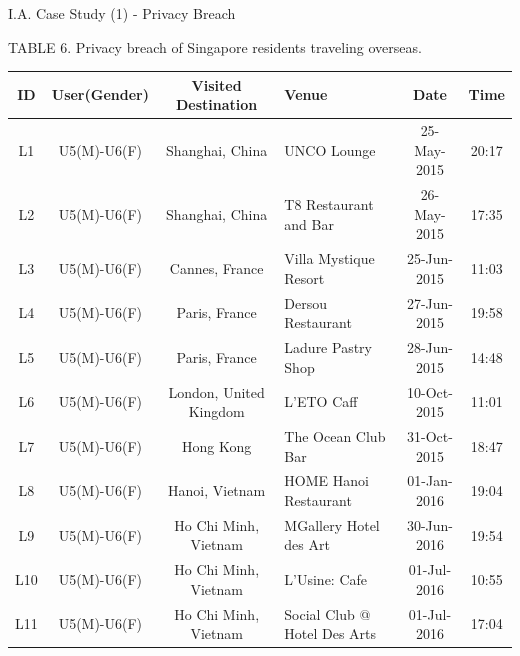 \documentclass[
 size=14pt,
 paper=smartboard,  %
 mode=present, 		%
 display=slides, 	%
 style=tuliplab,  	%
 pauseslide,
 fleqn,leqno]{powerdot}
\begin{document}


\begin{slide}[toc=,bm=]{I.A. Case Study (1) - Privacy Breach}

\begin{table}
	\fontsize{11pt}{11pt}\selectfont
	\setlength{\abovecaptionskip}{0pt}
	\setlength{\belowcaptionskip}{12pt}
	\centering
	\item
	TABLE 6. Privacy breach of Singapore residents traveling overseas\protect\footnotemark[1].\\[15pt]
	\begin{tabular}{c|c|c|l|c|c}	
	\toprule
	ID  				&  	\textbf{User(Gender)}		& 		\textbf{Visited Destination} 		& 		\textbf{Venue} 		& 	\textbf{Date} 		&	\textbf{Time}	\\
	\midrule
	L{\footnotesize1}	&	U{\footnotesize5}(M)-U{\footnotesize6}(F)	&	Shanghai, China 	&	UNCO Lounge				&	25-May-2015	&	20:17\\
	L{\footnotesize2}	&	U{\footnotesize5}(M)-U{\footnotesize6}(F)	&	Shanghai, China 	&	T8 Restaurant and Bar		&	26-May-2015	&	17:35\\
	L{\footnotesize3}	&	U{\footnotesize5}(M)-U{\footnotesize6}(F)	&	Cannes, France 	&	Villa Mystique Resort		&	25-Jun-2015	&	11:03\\
	L{\footnotesize4}	&	U{\footnotesize5}(M)-U{\footnotesize6}(F)	&	Paris, France 		&	Dersou Restaurant			&	27-Jun-2015	&	19:58\\
	L{\footnotesize5}	&	U{\footnotesize5}(M)-U{\footnotesize6}(F)	&	Paris, France 		&	Ladure Pastry Shop			&	28-Jun-2015	&	14:48\\
	L{\footnotesize6}	&	U{\footnotesize5}(M)-U{\footnotesize6}(F)	&	London, United Kingdom 		&	L'ETO Caff			&	10-Oct-2015	&	11:01\\
	L{\footnotesize7}	&	U{\footnotesize5}(M)-U{\footnotesize6}(F)	&	Hong Kong		&	The Ocean Club Bar			&	31-Oct-2015	&	18:47\\
	L{\footnotesize8}	&	U{\footnotesize5}(M)-U{\footnotesize6}(F)	&	Hanoi, Vietnam		&	HOME Hanoi Restaurant			&	01-Jan-2016	&	19:04\\
	L{\footnotesize9}	&	U{\footnotesize5}(M)-U{\footnotesize6}(F)	&	Ho Chi Minh, Vietnam		&	MGallery Hotel des Art		&	30-Jun-2016	&	19:54\\
	L{\footnotesize10}	&	U{\footnotesize5}(M)-U{\footnotesize6}(F)	&	Ho Chi Minh, Vietnam		&	L'Usine: Cafe		&	01-Jul-2016	&	10:55\\
	L{\footnotesize11}	&	U{\footnotesize5}(M)-U{\footnotesize6}(F)	&	Ho Chi Minh, Vietnam		&	Social Club @ Hotel Des Arts		&	01-Jul-2016	&	17:04\\
	\bottomrule
	\end{tabular}
\end{table}


\end{slide}
\end{document}
